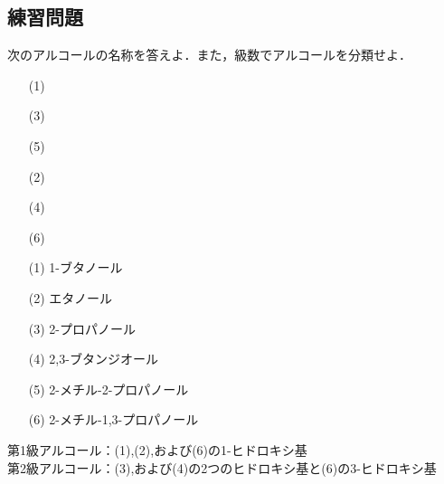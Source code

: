 \documentclass[a4paper,12pt]{ltjsreport}
\title{}
\author{}
\date{}
\begin{document}
\subsection*{練習問題}
\begin{que}
次のアルコールの名称を答えよ．また，級数でアルコールを分類せよ．\\[5pt]
\begin{minipage}{0.5\linewidth}
    \begin{itemize}
        \item [(1)]\\
        \item [(3)]\\[5pt]
        \item [(5)]
    \end{itemize}
\end{minipage}
\begin{minipage}{0.5\linewidth}
\begin{itemize}
    \item [(2)]\\
    \item [(4)]\\[5pt]
    \item [(6)]
\end{itemize}
\end{minipage}
\end{que}
\ans
\begin{itemize}
    \item [(1)]1-ブタノール　\\
    \item [(2)]エタノール\\
     \item [(3)]2-プロパノール\\
      \item [(4)]2,3-ブタンジオール\\
       \item [(5)]2-メチル-2-プロパノール\\
        \item [(6)]2-メチル-1,3-プロパノール\\
\end{itemize}
    第1級アルコール：(1),(2),および(6)の1-ヒドロキシ基\\[7pt]

   \noindent  第2級アルコール：(3),および(4)の2つのヒドロキシ基と(6)の3-ヒドロキシ基\\[7pt]
\end{document}
